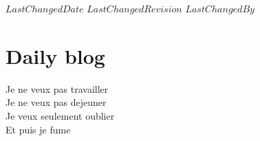 \ifsvnmulti
 {$LastChangedDate$}
 {$LastChangedRevision$} {$LastChangedBy$}
\fi

\chapter{Daily blog}
\label{c-DailyBlog}

\begin{bartlett}{
Je ne veux pas travailler\\
Je ne veux pas dejeuner\\
Je veux seulement oublier\\
Et puis je fume
            }
\end{bartlett}

\renewcommand{\ssp}{x}
\renewcommand{\vel}{\ensuremath{v}}   %


